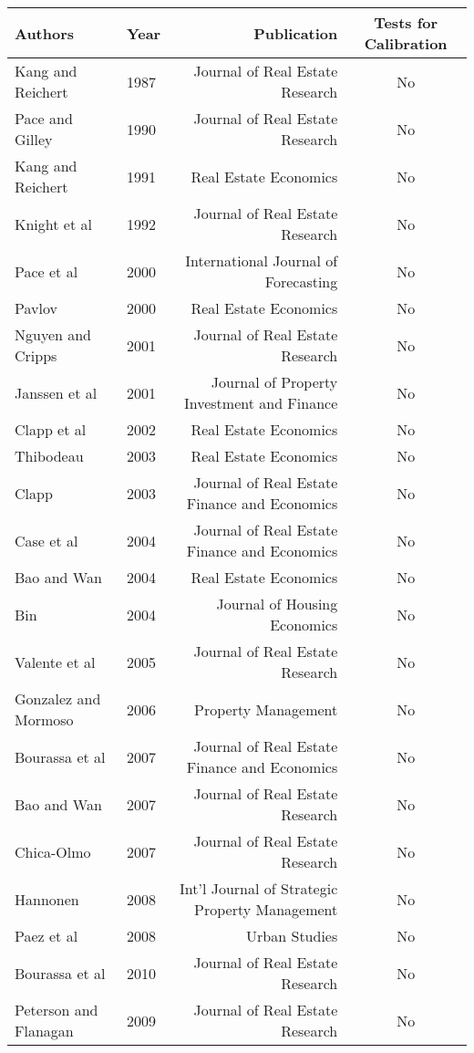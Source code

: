 \documentclass[colTwo]{anon}
\theoremstyle{definition}
\begin{document}
\begin{table*}[h!]
\centering
\begin{tabular}{|l|l|r|c|}
\hline
\textbf{Authors} & \textbf{Year} & \textbf{Publication} & \textbf{Tests for Calibration}\\
\hline
Kang and Reichert & 1987 & Journal of Real Estate Research & No \\
Pace and Gilley & 1990 & Journal of Real Estate Research & No \\
Kang and Reichert & 1991 & Real Estate Economics & No \\
Knight et al & 1992 & Journal of Real Estate Research & No \\
Pace et al & 2000 & International Journal of Forecasting & No \\
Pavlov & 2000 & Real Estate Economics & No \\
Nguyen and Cripps & 2001 & Journal of Real Estate Research & No \\
Janssen et al & 2001 & Journal of Property Investment and Finance & No \\
Clapp et al & 2002 & Real Estate Economics & No \\
Thibodeau & 2003 & Real Estate Economics & No \\
Clapp & 2003 & Journal of Real Estate Finance and Economics & No \\
Case et al & 2004 & Journal of Real Estate Finance and Economics & No \\
Bao and Wan & 2004 & Real Estate Economics & No \\
Bin & 2004 & Journal of Housing Economics & No \\
Valente et al & 2005 & Journal of Real Estate Research & No \\
Gonzalez and Mormoso & 2006 & Property Management & No \\
Bourassa et al & 2007 & Journal of Real Estate Finance and Economics & No \\
Bao and Wan & 2007 & Journal of Real Estate Research & No \\
Chica-Olmo & 2007 & Journal of Real Estate Research & No \\
Hannonen & 2008 & Int'l Journal of Strategic Property Management & No \\
Paez et al & 2008 & Urban Studies & No \\
Bourassa et al & 2010 & Journal of Real Estate Research & No \\
Peterson and Flanagan & 2009 & Journal of Real Estate Research & No \\

\end{tabular}
\end{table*}
\end{document}
